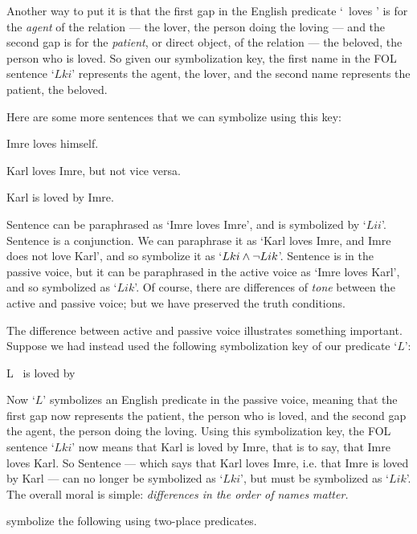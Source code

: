 Another way to put it is that the first gap in the English predicate   `\blank\ loves \blank' is for the \emph{agent} of the relation --- the lover, the person doing the loving --- and the second gap is for the \emph{patient}, or direct object, of the relation --- the beloved, the person who is loved.  So given our symbolization key, the first name in the FOL sentence `$Lki$' represents the agent, the lover, and the second name represents the patient, the beloved.



Here are some more sentences that we can symbolize using this key:
\begin{earg}
	\item[\ex{terms4}] Imre loves himself.
	\item[\ex{terms5}] Karl loves Imre, but not vice versa.
	\item[\ex{terms6}] Karl is loved by Imre.
\end{earg}
Sentence  can be paraphrased as `Imre loves Imre', and is symbolized by `$Lii$'. Sentence  is a conjunction. We can paraphrase it as `Karl loves Imre, and Imre does not love Karl', and so symbolize it as `$Lki \wedge \neg Lik$'. Sentence  is in the passive voice, but it can be paraphrased in the active voice as `Imre loves Karl', and so symbolized as `$Lik$'. Of course, there are differences of \emph{tone} between the active and passive voice; but we have preserved the truth conditions.


The difference between active and passive voice illustrates something important.  Suppose we had instead used the following symbolization key of our predicate `$L$':
	\begin{ekey}
		\item[L] \blank\ is loved by \blank
	\end{ekey}
Now `$L$'  symbolizes an English predicate in the passive voice, meaning that the first gap now represents the patient, the person who is loved, and the second gap the agent, the person doing the loving.  Using this symbolization key, the FOL sentence `$Lki$' now means that Karl is loved by Imre, that is to say, that Imre loves Karl.  So Sentence  --- which says that Karl loves Imre, i.e. that Imre is loved by Karl --- can no longer be symbolized as `$Lki$', but must be symbolized as `$Lik$'.  The overall moral is simple: \emph{differences in the order of names matter.}

\practiceproblems
\problempart symbolize the following using two-place predicates.

